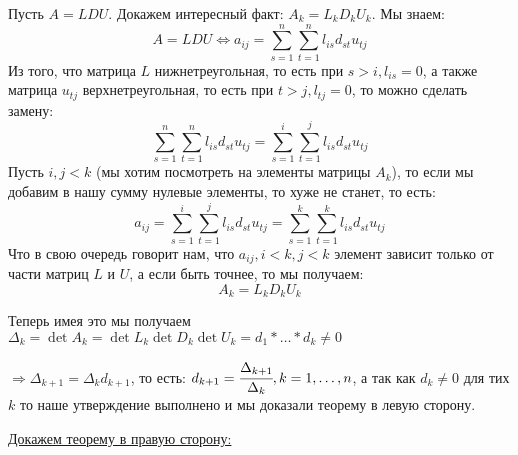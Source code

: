     Пусть $A  = LDU$.  Докажем интересный факт:  $A_k = L_k D_k U_k$. Мы знаем:
    $$A = LDU \Leftrightarrow a_{ij} = \sum\limits_{s =1 }^n \sum\limits_{t=1}^n l_{is}d_{st} u_{tj}$$
    Из того, что матрица $L$ нижнетреугольная, то есть при $s> i , l_{is} = 0$, а также матрица $u_{tj}$ верхнетреугольная, то есть при $t>j, l_{tj}=0$, то можно сделать замену:
    $$\sum\limits_{s =1 }^n \sum\limits_{t=1}^n l_{is}d_{st} u_{tj} = \sum\limits_{s =1 }^i \sum\limits_{t=1}^j l_{is}d_{st} u_{tj}$$
    Пусть $i,j < k$ (мы хотим посмотреть на элементы матрицы $A_k$), то если мы добавим в нашу сумму нулевые элементы, то хуже не станет, то есть:
    $$a_{ij} =  \sum\limits_{s =1 }^i \sum\limits_{t=1}^j l_{is}d_{st} u_{tj} = \sum\limits_{s =1 }^k \sum\limits_{t=1}^k l_{is}d_{st} u_{tj}$$
    Что в свою очередь говорит нам, что $a_{ij}, i<k,j<k$ элемент зависит только  от части матриц $L$ и $U$, а если быть точнее, то мы получаем:
    $$A_k = L_k D_k U_k$$

    Теперь имея это мы получаем $\Delta_k = \det A_k = \det L_k \det D_k \det U_k = d_1 * \ldots * d_k \neq 0$

    $\Rightarrow \Delta_{k+1} = \Delta_k d_{k+1}$, то есть: $d_{k+1} = \cfrac{\Delta_{k+1}}{\Delta_k}, k = 1,\ldots, n$, а так как $d_k\neq 0 $ для
    тих $k$ то наше утверждение выполнено и мы доказали теорему в левую сторону.

    \uline{Докажем теорему в правую сторону:}


